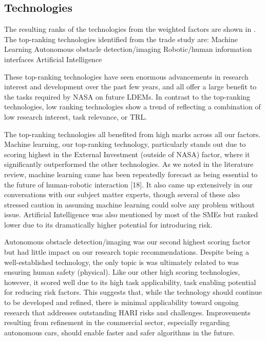 \subsection{Technologies}
The resulting ranks of the technologies from the weighted factors are shown in . The top-ranking technologies identified from the trade study are:
	Machine Learning
	Autonomous obstacle detection/imaging
	Robotic/human information interfaces
	Artificial Intelligence

These top-ranking technologies have seen enormous advancements in research interest and development over the past few years, and all offer a large benefit to the tasks required by NASA on future LDEMs. In contrast to the top-ranking technologies, low ranking technologies show a trend of reflecting a combination of low research interest, task relevance, or TRL.

The top-ranking technologies all benefited from high marks across all our factors. Machine learning, our top-ranking technology, particularly stands out due to scoring highest in the External Investment (outside of NASA) factor, where it significantly outperformed the other technologies. As we noted in the literature review, machine learning came has been repeatedly forecast as being essential to the future of human-robotic interaction [18]. It also came up extensively in our conversations with our subject matter experts, though several of these also stressed caution in assuming machine learning could solve any problem without issue. Artificial Intelligence was also mentioned by most of the SMEs but ranked lower due to its dramatically higher potential for introducing risk.

Autonomous obstacle detection/imaging was our second highest scoring factor but had little impact on our research topic recommendations. Despite being a well-established technology, the only topic is was ultimately related to was ensuring human safety (physical). Like our other high scoring technologies, however, it scored well due to its high task applicability, task enabling potential for reducing risk factors. This suggests that, while the technology should continue to be developed and refined, there is minimal applicability toward ongoing research that addresses outstanding HARI risks and challenges. Improvements resulting from refinement in the commercial sector, especially regarding autonomous cars, should enable faster and safer algorithms in the future.

